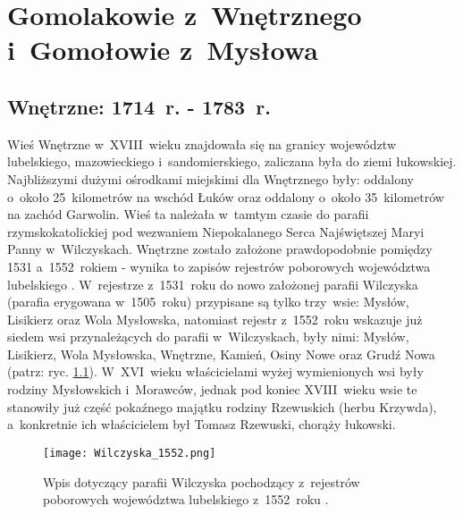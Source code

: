 \chapter{Gomolakowie z~Wnętrznego i~Gomołowie z~Mysłowa}



\section{Wnętrzne: 1714~r. - 1783~r.}

Wieś Wnętrzne w~XVIII~wieku znajdowała się na granicy województw lubelskiego, 
mazowieckiego i~sandomierskiego, zaliczana była do ziemi łukowskiej. 
Najbliższymi dużymi ośrodkami miejskimi dla Wnętrznego były: oddalony 
o~około 25~kilometrów na wschód Łuków oraz oddalony o~około 35~kilometrów na 
zachód Garwolin. Wieś ta należała w~tamtym czasie do parafii 
rzymskokatolickiej pod wezwaniem Niepokalanego Serca Najświętszej Maryi Panny 
w~Wilczyskach. Wnętrzne zostało założone prawdopodobnie pomiędzy 1531 
a~1552~rokiem - wynika to zapisów rejestrów poborowych województwa 
lubelskiego \cite{apawinski}. W~rejestrze z~1531~roku do nowo założonej 
parafii Wilczyska (parafia erygowana w~1505~roku) przypisane są tylko 
trzy~wsie: Mysłów, Lisikierz oraz Wola Mysłowska, natomiast rejestr 
z~1552~roku wskazuje już siedem wsi przynależących do parafii w~Wilczyskach, 
były nimi: Mysłów, Lisikierz, Wola Mysłowska, Wnętrzne, Kamień, Osiny Nowe 
oraz Grudź Nowa (patrz: ryc. \ref{fig:wilczyska_1552}). W~XVI~wieku 
właścicielami wyżej wymienionych wsi były rodziny Mysłowskich i~Morawców, 
jednak pod koniec XVIII~wieku wsie te stanowiły już część pokaźnego majątku 
rodziny Rzewuskich (herbu Krzywda), a~konkretnie ich właścicielem był Tomasz 
Rzewuski, chorąży łukowski. 
\nocite{sulimierski}

\begin{figure}[!ht]
    \vspace*{0.5cm}
    \centering \texttt{[image: Wilczyska\_1552.png]}
    \captionsetup{format=hang}
    \caption{Wpis dotyczący parafii Wilczyska pochodzący z~rejestrów 
    poborowych województwa lubelskiego z~1552~roku \cite{apawinski}.}
    \label{fig:wilczyska_1552}
\end{figure}

